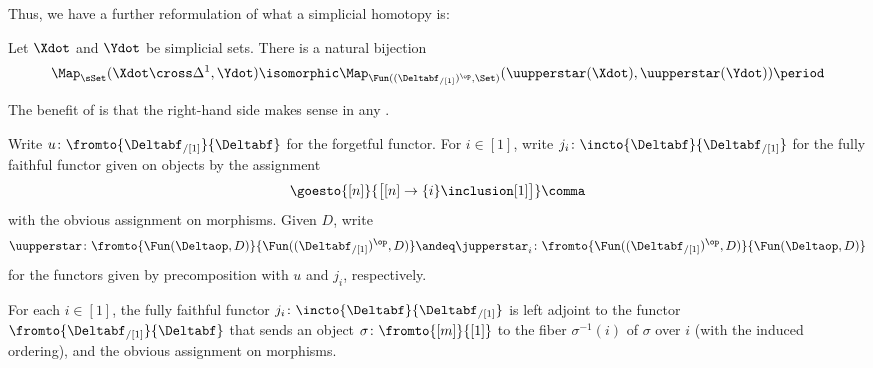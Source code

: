 Thus, we have a further reformulation of what a simplicial homotopy is:

\begin{corollary}\label{cor:reformshtpy}
	Let $ \Xdot $ and $ \Ydot $ be simplicial sets.
	There is a natural bijection 
	\begin{equation*}
		\Map_{\sSet}(\Xdot \cross \Delta^1,\Ydot) \isomorphic \Map_{\Fun((\Deltabf_{/[1]})^{\op},\Set)}(\uupperstar(\Xdot),\uupperstar(\Ydot)) \period 
	\end{equation*}
\end{corollary}

\noindent The benefit of  is that the right-hand side makes sense in any \category.

\begin{notation}
	Write $ u \colon \fromto{\Deltabf_{/[1]}}{\Deltabf} $ for the forgetful functor.
	For $ i \in [1] $, write $ j_i \colon \incto{\Deltabf}{\Deltabf_{/[1]}} $ for the fully faithful functor given on objects by the assignment
	\begin{equation*}
		\goesto{[n]}{\big[[n] \to \{i\} \inclusion [1]\big]} \comma
	\end{equation*}
	with the obvious assignment on morphisms.
	Given \acategory $ D $, write
	\begin{equation*}
		\uupperstar \colon \fromto{\Fun(\Deltaop,D)}{\Fun((\Deltabf_{/[1]})^{\op},D)} \andeq \jupperstar_i \colon \fromto{\Fun((\Deltabf_{/[1]})^{\op},D)}{\Fun(\Deltaop,D)}
	\end{equation*}
	for the functors given by precomposition with $ u $ and $ j_i $, respectively.
\end{notation}

\begin{observation}\label{obs:jadjoint}
	For each $ i \in [1] $, the fully faithful functor $ j_i \colon \incto{\Deltabf}{\Deltabf_{/[1]}} $ is left adjoint to the functor $ \fromto{\Deltabf_{/[1]}}{\Deltabf} $ that sends an object $ \sigma \colon \fromto{[m]}{[1]} $ to the fiber $ \sigma^{-1}(i) $ of $ \sigma $ over $ i $ (with the induced ordering), and the obvious assignment on morphisms.
\end{observation}

